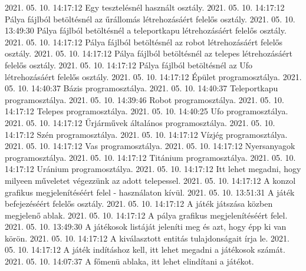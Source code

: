  {2021. 05. 10. 14:17:12} {Egy tesztelésnél használt osztály.}
 {2021. 05. 10. 14:17:12} {Pálya fájlból betöltésnél az űrállomás létrehozásáért felelős osztály.}
 {2021. 05. 10. 13:49:30} {Pálya fájlból betöltésnél a teleportkapu létrehozásáért felelős osztály.}
 {2021. 05. 10. 14:17:12} {Pálya fájlból betöltésnél az robot létrehozásáért felelős osztály.}
 {2021. 05. 10. 14:17:12} {Pálya fájlból betöltésnél az telepes létrehozásáért felelős osztály.}
 {2021. 05. 10. 14:17:12} {Pálya fájlból betöltésnél az Ufo létrehozásáért felelős osztály.}
 {2021. 05. 10. 14:17:12} {Épület programosztálya.}
 {2021. 05. 10. 14:40:37} {Bázis programosztálya.}
 {2021. 05. 10. 14:40:37} {Teleportkapu programosztálya.}
 {2021. 05. 10. 14:39:46} {Robot programosztálya.}
 {2021. 05. 10. 14:17:12} {Telepes programosztálya.}
 {2021. 05. 10. 14:40:25} {Ufo programosztálya.}
 {2021. 05. 10. 14:17:12} {Űrjárművek általános programosztálya.}
 {2021. 05. 10. 14:17:12} {Szén programosztálya.}
 {2021. 05. 10. 14:17:12} {Vízjég programosztálya.}
 {2021. 05. 10. 14:17:12} {Vas programosztálya.}
 {2021. 05. 10. 14:17:12} {Nyersanyagok programosztálya.}
 {2021. 05. 10. 14:17:12} {Titánium programosztálya.}
 {2021. 05. 10. 14:17:12} {Uránium programosztálya.}
 {2021. 05. 10. 14:17:12} {Itt lehet megadni, hogy milyeen műveletet végezzünk az adott telepessel.}
 {2021. 05. 10. 14:17:12} {A konzol grafikus megjelenítéséért felel - használaton kívül.}
 {2021. 05. 10. 13:51:31} {A játék befejezéséért felelős osztály.}
 {2021. 05. 10. 14:17:12} {A játék játszása közben megjelenő ablak.}
 {2021. 05. 10. 14:17:12} {A pálya grafikus megjelenítéséért felel.}
 {2021. 05. 10. 13:49:30} {A játékosok listáját jeleníti meg és azt, hogy épp ki van körön.}
 {2021. 05. 10. 14:17:12} {A kiválasztott entitás tulajdonságait írja le.}
 {2021. 05. 10. 14:17:12} {A játék indításhoz kell, itt lehet megadni a játékosok számát.}
 {2021. 05. 10. 14:07:37} {A főmenü ablaka, itt lehet elindítani a játékot.}

